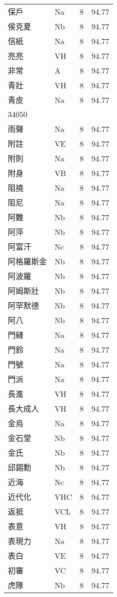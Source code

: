 \documentclass[twocolumn]{book}
\begin{document}
\begin{supertabular}{llrr}
保戶 & Na & 8 &  94.77\\
侯克夏 & Nb & 8 &  94.77\\
信紙 & Na & 8 &  94.77\\
亮亮 & VH & 8 &  94.77\\
非常 & A & 8 &  94.77\\
青壯 & VH & 8 &  94.77\\
青皮 & Na & 8 &  94.77\\
34050\\
雨聲 & Na & 8 &  94.77\\
附註 & VE & 8 &  94.77\\
附則 & Na & 8 &  94.77\\
附身 & VB & 8 &  94.77\\
阻撓 & Na & 8 &  94.77\\
阻尼 & Na & 8 &  94.77\\
阿難 & Nb & 8 &  94.77\\
阿萍 & Nb & 8 &  94.77\\
阿富汗 & Nc & 8 &  94.77\\
阿格羅斯金 & Nb & 8 &  94.77\\
阿波羅 & Nb & 8 &  94.77\\
阿姆斯壯 & Nb & 8 &  94.77\\
阿罕默德 & Nb & 8 &  94.77\\
阿八 & Nb & 8 &  94.77\\
門縫 & Na & 8 &  94.77\\
門鈴 & Na & 8 &  94.77\\
門號 & Na & 8 &  94.77\\
門派 & Na & 8 &  94.77\\
長進 & VH & 8 &  94.77\\
長大成人 & VH & 8 &  94.77\\
金烏 & Na & 8 &  94.77\\
金石堂 & Nb & 8 &  94.77\\
金氏 & Nb & 8 &  94.77\\
邱錫勳 & Nb & 8 &  94.77\\
近海 & Nc & 8 &  94.77\\
近代化 & VHC & 8 &  94.77\\
返抵 & VCL & 8 &  94.77\\
表意 & VH & 8 &  94.77\\
表現力 & Na & 8 &  94.77\\
表白 & VE & 8 &  94.77\\
初審 & VC & 8 &  94.77\\
虎隊 & Nb & 8 &  94.77\\

\end{supertabular}
\end{document}
